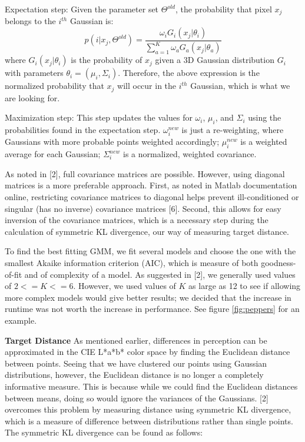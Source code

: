 \documentclass[10pt,twocolumn,letterpaper]{article}
\begin{document}
Expectation step: Given the parameter set $\Theta^{old}$, the probability that pixel $x_j$ belongs to the $i^{th}$ Gaussian is:
\[
  p(i | x_j, \Theta^{old}) = \frac{\omega_i G_i(x_j | \theta_i)}{\sum_{a=1}^K \omega_a G_a(x_j | \theta_a)}
\]
where $G_i(x_j | \theta_i)$ is the probability of $x_j$ given a 3D Gaussian distribution $G_i$ with parameters $\theta_i = (\mu_i, \Sigma_i)$. Therefore, the above expression is the normalized probability that $x_j$ will occur in the $i^{th}$ Gaussian, which is what we are looking for. 

Maximization step: This step updates the values for $\omega_i$, $\mu_i$, and $\Sigma_i$ using the probabilities found in the expectation step. $\omega_i^{new}$ is just a re-weighting, where Gaussians with more probable points weighted accordingly; $\mu_i^{new}$ is a weighted average for each Gaussian; $\Sigma_i^{new}$ is a normalized, weighted covariance. 

As noted in [2], full covariance matrices are possible. However, using diagonal matrices is a more preferable approach. First, as noted in Matlab documentation online, restricting covariance matrices to diagonal helps prevent ill-conditioned or singular (has no inverse) covariance matrices [6]. Second, this allows for easy inversion of the covariance matrices, which is a necessary step during the calculation of symmetric KL divergence, our way of measuring target distance. 

To find the best fitting GMM, we fit several models and choose the one with the smallest Akaike information criterion (AIC), which is measure of both goodness-of-fit and of complexity of a model. As suggested in [2], we generally used values of $2 <= K <= 6$. However, we used values of $K$ as large as 12 to see if allowing more complex models would give better results; we decided that the increase in runtime was not worth the increase in performance. See figure \ref{fig:peppers} for an example. 

\textbf{Target Distance}
As mentioned earlier, differences in perception can be approximated in the CIE L*a*b* color space by finding the Euclidean distance between points. Seeing that we have clustered our points using Gaussian distributions, however, the Euclidean distance is no longer a completely informative measure. This is because while we could find the Euclidean distances between means, doing so would ignore the variances of the Gaussians. [2] overcomes this problem by measuring distance using symmetric KL divergence, which is a measure of difference between distributions rather than single points. The symmetric KL divergence can be found as follows:
\end{document}
